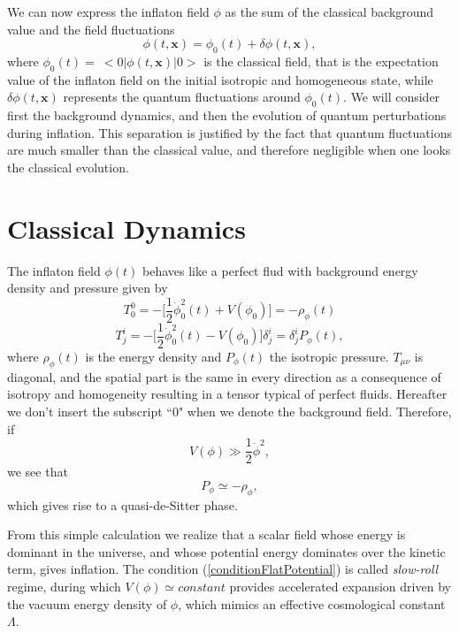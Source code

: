 \documentclass[11pt,a4paper,twoside]{book}
\begin{document}
We can now express the inflaton field $ \phi $ as the sum of the classical background value and the field fluctuations
\begin{equation}
	\label{splitInflaton}
	\phi(t,\textbf{x})=\phi_{0}(t) + \delta \phi(t,\textbf{x}),
\end{equation}
where $\phi_{0}(t) =\ <0|\phi(t,\textbf{x})|0> $  is the classical field, that is the expectation value of the inflaton field on the initial isotropic and homogeneous state, while $\delta \phi (t,\textbf{x})$ represents the quantum fluctuations around $ \phi_{0}(t)$.
We will consider first the background dynamics, and then the evolution of quantum perturbations during inflation. This separation is justified by the fact that quantum fluctuations are much smaller than the classical value, and therefore negligible when one looks the classical evolution.

\section{Classical Dynamics}
The inflaton field $ \phi(t) $  behaves like a perfect flud with background energy density and pressure given by 
\begin{equation}
	\label{energyDensityPressure}
	T^{0}_{0} = -\Bigg [\dfrac{1}{2}  \dot{\phi}^{2}_{0}(t) + V(\phi_{0}) \Bigg ] = -\rho_{\phi}(t)
\end{equation}
\begin{equation*}
	T^{i}_{j} = -\Bigg [\dfrac{1}{2}  \dot{\phi}^{2}_{0}(t) - V(\phi_{0}) \Bigg ]\delta^{i}_{j} = \delta^{i}_{j} P_{\phi} (t),	
\end{equation*}
where $ \rho_{\phi} (t) $ is the energy density and $ P_{\phi} (t) $ the isotropic pressure. $ T_{\mu\nu} $ is diagonal, and the spatial part is the same in every direction as a consequence of isotropy and homogeneity resulting in a tensor typical of perfect fluids. Hereafter we don't insert the subscript \textquotedblleft 0" when we denote the background field. Therefore, if 
\begin{equation}
	\label{conditionFlatPotential}
	V(\phi) \gg \frac{1}{2} \dot{\phi}^{2},
\end{equation}
we see that 
\begin{equation}
	\label{deSitterCondition}
	P_{\phi} \simeq -\rho_{\phi},
\end{equation}
which gives rise to a quasi-de-Sitter phase.

From this simple calculation we realize that a scalar field whose energy is dominant in the universe, and whose potential energy dominates over the kinetic term, gives inflation. The condition (\ref{conditionFlatPotential}) is called \textit{slow-roll} regime, during which $ V(\phi) \simeq constant $ provides accelerated expansion driven by the vacuum energy density of $ \phi $, which mimics an effective cosmological constant $ \Lambda $.
\end{document}
